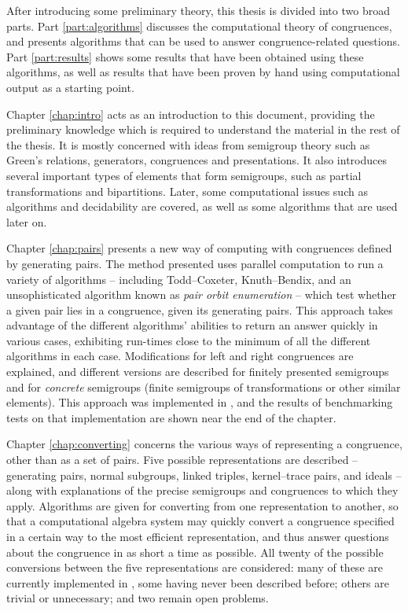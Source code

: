 After introducing some preliminary theory, this thesis is divided into two broad
parts.  Part \ref{part:algorithms} discusses the computational theory of
congruences, and presents algorithms that can be used to answer
congruence-related questions.  Part \ref{part:results} shows some results that
have been obtained using these algorithms, as well as results that have been
proven by hand using computational output as a starting point.

Chapter \ref{chap:intro} acts as an introduction to this document, providing the
preliminary knowledge which is required to understand the material in the rest
of the thesis.  It is mostly concerned with ideas from semigroup theory such as
Green's relations, generators, congruences and presentations.  It also
introduces several important types of elements that form semigroups, such as
partial transformations and bipartitions.  Later, some computational issues such
as algorithms and decidability are covered, as well as some algorithms that are
used later on.

Chapter \ref{chap:pairs} presents a new way of computing with congruences
defined by generating pairs.  The method presented uses parallel computation to
run a variety of algorithms -- including Todd--Coxeter, Knuth--Bendix, and an
unsophisticated algorithm known as \textit{pair orbit enumeration} -- which test
whether a given pair lies in a congruence, given its generating pairs.  This
approach takes advantage of the different algorithms' abilities to return an
answer quickly in various cases, exhibiting run-times close to the minimum of
all the different algorithms in each case.  Modifications for left and right
congruences are explained, and different versions are described for finitely
presented semigroups and for \textit{concrete} semigroups (finite semigroups of
transformations or other similar elements).  This approach was implemented in
\libsemigroups{} \cite{libsemigroups}, and the results of benchmarking tests on
that implementation are shown near the end of the chapter.

Chapter \ref{chap:converting} concerns the various ways of representing a
congruence, other than as a set of pairs.  Five possible representations are
described -- generating pairs, normal subgroups, linked triples, kernel--trace
pairs, and ideals -- along with explanations of the precise semigroups and
congruences to which they apply.  Algorithms are given for converting from one
representation to another, so that a computational algebra system may quickly
convert a congruence specified in a certain way to the most efficient
representation, and thus answer questions about the congruence in as short a
time as possible.  All twenty of the possible conversions between the five
representations are considered: many of these are currently implemented in
\Semigroups{} \cite{semigroups}, some having never been described before; others
are trivial or unnecessary; and two remain open problems.

